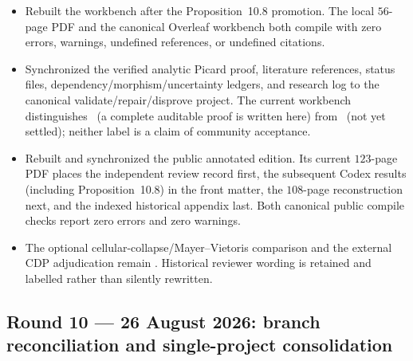 \begin{itemize}[leftmargin=1.8em]
\item Rebuilt the workbench after the Proposition~10.8 promotion.  The local
  \(56\)-page PDF and the canonical Overleaf workbench both compile with
  zero errors, warnings, undefined references, or undefined citations.
\item Synchronized the verified analytic Picard proof, literature references,
  status files, dependency/morphism/uncertainty ledgers, and research log to
  the canonical validate/repair/disprove project.  The current workbench
  distinguishes \Verified\ (a complete auditable proof is written here) from
  \Open\ (not yet settled); neither label is a claim of community acceptance.
\item Rebuilt and synchronized the public annotated edition.  Its current
  \(123\)-page PDF places the independent review record first, the subsequent
  Codex results (including Proposition~10.8) in the front matter, the
  \(108\)-page reconstruction next, and the indexed historical appendix last.
  Both canonical public compile checks report zero errors and zero warnings.
\item The optional cellular-collapse/Mayer--Vietoris comparison and the
  external CDP adjudication remain \Open.  Historical reviewer wording is
  retained and labelled rather than silently rewritten.
\end{itemize}

\subsection*{Round 10 --- 26 August 2026: branch reconciliation and single-project consolidation}

